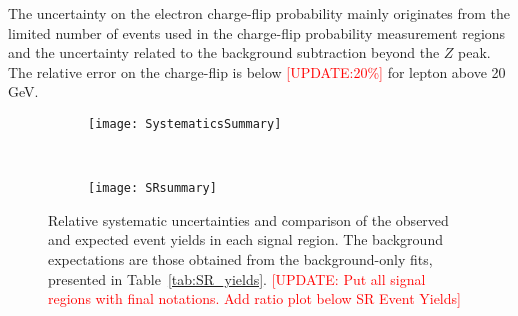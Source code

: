 The uncertainty on the electron charge-flip probability mainly originates from the limited number of events used in 
the charge-flip probability measurement regions and the uncertainty related to the background subtraction 
beyond the $Z$ peak. The relative error on the charge-flip is below \textcolor{red}{[UPDATE:20\%]} for lepton \pt above 20 GeV.

\begin{figure}[H]
\begin{center}
\begin{subfigure}[t]{0.95\textwidth}\texttt{[image: SystematicsSummary]}\caption{}\end{subfigure} \\
\begin{subfigure}[t]{0.87\textwidth}\texttt{[image: SRsummary]}\caption{}\end{subfigure}
\end{center}
\caption{Relative systematic uncertainties and comparison of the observed and expected event yields in each signal region. 
The background expectations are those obtained from the background-only fits, presented in Table~\ref{tab:SR_yields}. 
\textcolor{red}{[UPDATE: Put all signal regions with final notations. Add ratio plot below SR Event Yields]}} 
\label{fig:PlotSR}
\end{figure}

